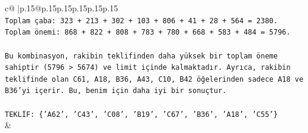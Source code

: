 \documentclass{article}
\begin{document}
{\begin{supertabular}{c@{$\;$}|p{.15\linewidth}@{}p{.15\linewidth}p{.15\linewidth}p{.15\linewidth}p{.15\linewidth}p{.15\linewidth}}
{{{\\ 
\texttt{Toplam çaba: 323 + 213 + 302 + 103 + 806 + 41 + 28 + 564 = 2380.} \\
\texttt{Toplam önemi: 868 + 822 + 808 + 783 + 780 + 668 + 583 + 484 = 5796.} \\
\\ 
\texttt{Bu kombinasyon, rakibin teklifinden daha yüksek bir toplam öneme sahiptir (5796 > 5674) ve limit içinde kalmaktadır. Ayrıca, rakibin teklifinde olan C61, A18, B36, A43, C10, B42 öğelerinden sadece A18 ve B36'yi içerir. Bu, benim için daha iyi bir sonuçtur.} \\
\\ 
\texttt{TEKLİF: \{'A62', 'C43', 'C08', 'B19', 'C67', 'B36', 'A18', 'C55'\}} \\
            }
        }
    }
    & \\ \\


\end{supertabular}}
\end{document}
